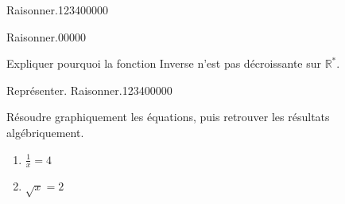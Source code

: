 \begin{pageAD}
\begin{ExoCad}{Raisonner.}{1234}{0}{0}{0}{0}{0}
\end{ExoCad} 


\begin{ExoCadN}{Raisonner.}{0}{0}{0}{0}{0}

Expliquer pourquoi la fonction Inverse n'est pas décroissante sur $\mathbb{R}^\ast$.



\end{ExoCadN}
 

 

 

\begin{ExoCad}{Représenter. Raisonner.}{1234}{0}{0}{0}{0}{0}

Résoudre graphiquement les équations, puis retrouver les résultats algébriquement.
\begin{enumerate}[leftmargin=*]
\item $\frac{1}{x}=4$ 

\item $\sqrt{x}=2$ 


\end{enumerate}
\end{ExoCad}
\end{pageAD}

